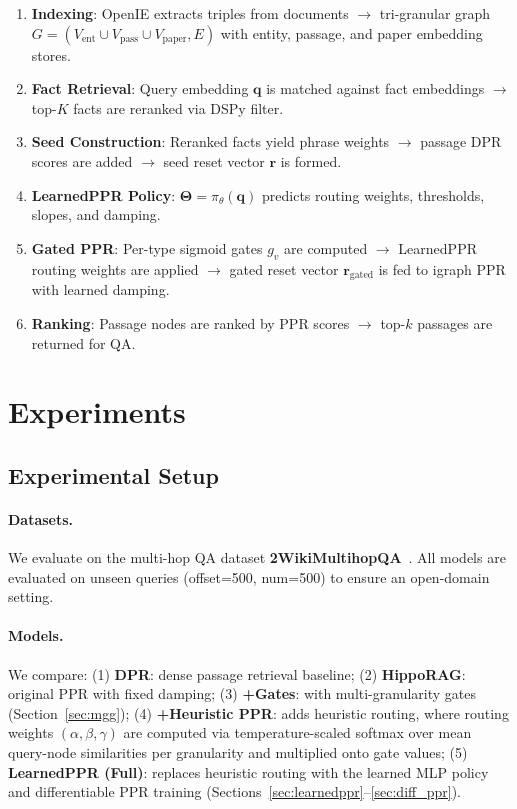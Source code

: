 \documentclass[conference,a4paper]{IEEEtran}
\newcommand{\bm}[1]{\boldsymbol{#1}}
\begin{document}
\begin{enumerate}[leftmargin=*, itemsep=2pt]
    \item \textbf{Indexing}: OpenIE extracts triples from documents $\to$ tri-granular graph $G = (V_{\text{ent}} \cup V_{\text{pass}} \cup V_{\text{paper}}, E)$ with entity, passage, and paper embedding stores.
    \item \textbf{Fact Retrieval}: Query embedding $\bm{q}$ is matched against fact embeddings $\to$ top-$K$ facts are reranked via DSPy filter.
    \item \textbf{Seed Construction}: Reranked facts yield phrase weights $\to$ passage DPR scores are added $\to$ seed reset vector $\bm{r}$ is formed.
    \item \textbf{LearnedPPR Policy}: $\bm{\Theta} = \pi_\theta(\bm{q})$ predicts routing weights, thresholds, slopes, and damping.
    \item \textbf{Gated PPR}: Per-type sigmoid gates $g_v$ are computed $\to$ LearnedPPR routing weights are applied $\to$ gated reset vector $\bm{r}_{\text{gated}}$ is fed to igraph PPR with learned damping.
    \item \textbf{Ranking}: Passage nodes are ranked by PPR scores $\to$ top-$k$ passages are returned for QA.
\end{enumerate}

\section{Experiments}\label{sec:exp}

\subsection{Experimental Setup}

\paragraph{Datasets.}
We evaluate on the multi-hop QA dataset \textbf{2WikiMultihopQA}~\cite{ho2020wiki}. All models are evaluated on unseen queries (offset=500, num=500) to ensure an open-domain setting.

\paragraph{Models.}
We compare: (1) \textbf{DPR}: dense passage retrieval baseline; (2) \textbf{HippoRAG}: original PPR with fixed damping; (3) \textbf{+Gates}: with multi-granularity gates (Section~\ref{sec:mgg}); (4) \textbf{+Heuristic PPR}: adds heuristic routing, where routing weights $(\alpha, \beta, \gamma)$ are computed via temperature-scaled softmax over mean query-node similarities per granularity and multiplied onto gate values; (5) \textbf{LearnedPPR (Full)}: replaces heuristic routing with the learned MLP policy and differentiable PPR training (Sections~\ref{sec:learnedppr}--\ref{sec:diff_ppr}).
\end{document}
